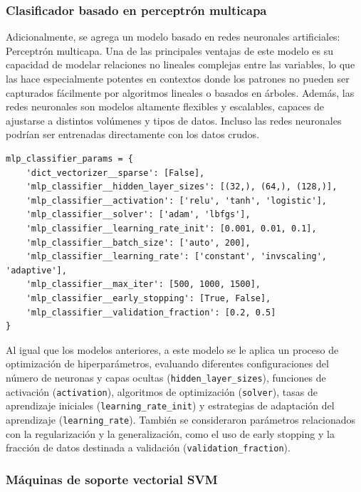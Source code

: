 \documentclass[11pt,a4paper,spanish]{book}
\numberwithin{equation}{chapter}
\numberwithin{figure}{chapter}
\begin{document}
\subsubsection{Clasificador basado en perceptrón multicapa}

Adicionalmente, se agrega un modelo basado en redes neuronales artificiales: Perceptrón 
multicapa. Una de las principales ventajas de este modelo es su capacidad de modelar 
relaciones no lineales complejas entre las variables, lo que las hace especialmente 
potentes en contextos donde los patrones no pueden ser capturados fácilmente por 
algoritmos lineales o basados en árboles. Además, las redes neuronales son modelos 
altamente flexibles y escalables, capaces de ajustarse a distintos volúmenes y tipos de 
datos. Incluso las redes neuronales podrían ser entrenadas directamente con los datos 
crudos. 


\vspace{5mm}
\begin{lstlisting}
mlp_classifier_params = {
    'dict_vectorizer__sparse': [False],
    'mlp_classifier__hidden_layer_sizes': [(32,), (64,), (128,)],
    'mlp_classifier__activation': ['relu', 'tanh', 'logistic'],
    'mlp_classifier__solver': ['adam', 'lbfgs'],
    'mlp_classifier__learning_rate_init': [0.001, 0.01, 0.1],
    'mlp_classifier__batch_size': ['auto', 200],
    'mlp_classifier__learning_rate': ['constant', 'invscaling', 'adaptive'],
    'mlp_classifier__max_iter': [500, 1000, 1500],
    'mlp_classifier__early_stopping': [True, False],
    'mlp_classifier__validation_fraction': [0.2, 0.5]
}
\end{lstlisting}

Al igual que los modelos anteriores, a este modelo se le aplica un proceso de 
optimización de hiperparámetros, evaluando diferentes configuraciones del número de 
neuronas y capas ocultas (\lstinline|hidden_layer_sizes|), funciones de activación 
(\lstinline|activation|), algoritmos de optimización (\lstinline|solver|), tasas de 
aprendizaje iniciales (\lstinline|learning_rate_init|) y estrategias de adaptación del 
aprendizaje (\lstinline|learning_rate|). También se consideraron parámetros relacionados 
con la regularización y la generalización, como el uso de early stopping y la fracción 
de datos destinada a validación (\lstinline|validation_fraction|). 


\subsubsection{Máquinas de soporte vectorial SVM}
\end{document}
